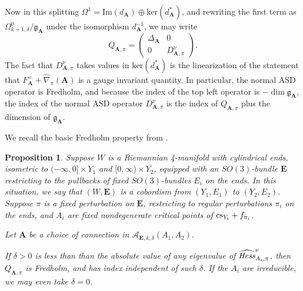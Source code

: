 \documentclass{memo-l}
\newtheorem{proposition}[theorem]{Proposition}
\theoremstyle{definition}
\theoremstyle{remark}
\numberwithin{section}{chapter}
\numberwithin{equation}{chapter}
\begin{document}
Now in this splitting $\Omega^1 = \text{Im}(d_{\mathbf{A}}) \oplus \text{ker}(d_{\mathbf{A}}^*)$, and rewriting the first term as $\Omega^0_{k+1,\delta}/\mathfrak g_{\mathbf{A}}$ under the isomorphism $d_{\mathbf{A}}^{-1}$, we may write 
$$Q_{\mathbf{A},\pi} = \begin{pmatrix}\Delta_{\mathbf{A}} & 0 \\ 0 & D^\nu_{\mathbf{A},\pi}\end{pmatrix}.$$ 
The fact that $D^\nu_{\mathbf{A},\pi}$ takes values in $\text{ker}(d_{\mathbf{A}}^*)$ is the linearization of the statement that $F_{\mathbf{A}}^+ + \widehat{\nabla}_\pi(\mathbf{A})$ is a gauge invariant quantity. In particular, the normal ASD operator is Fredholm, and because the index of the top left operator is $- \dim \mathfrak g_{\mathbf{A}}$, the index of the normal ASD operator $D^\nu_{\mathbf{A},\pi}$ is the index of $Q_{\mathbf{A},\pi}$ plus the dimension of $\mathfrak g_{\mathbf{A}}$.

We recall the basic Fredholm property from \cite[Sections~3.2~and~3.3.1]{Don}.

\begin{proposition}\label{Fred1}Suppose $W$ is a Riemannian 4-manifold with cylindrical ends, isometric to $(-\infty, 0] \times Y_1$ and $[0,\infty) \times \overline{Y_2}$, equipped with an $SO(3)$-bundle $\mathbf{E}$ restricting to the pullbacks of fixed $SO(3)$-bundles $E_i$ on the ends. In this situation, we say that $(W,\mathbf{E})$ is a cobordism from $(Y_1, E_1)$ to $(Y_2, E_2)$. Suppose $\pi$ is a fixed perturbation on $\mathbf{E}$, restricting to regular perturbations $\pi_i$ on the ends, and $A_i$ are fixed nondegenerate critical points of $\textup{cs}_{Y_i} + f_{\pi_i}$. 

Let $\mathbf{A}$ be a choice of connection in $\mathcal A_{\mathbf{E},k,\delta}(A_1,A_2)$. 

If $\delta > 0$ is less than than the absolute value of any eigenvalue of $\widehat{\text{\em{Hess}}}^\nu_{A_i, \pi}$, then $Q_{\mathbf{A},\pi}$ is Fredholm, and has index independent of such $\delta$. If the $A_i$ are irreducible, we may even take $\delta = 0$.
\end{proposition}
\end{document}
